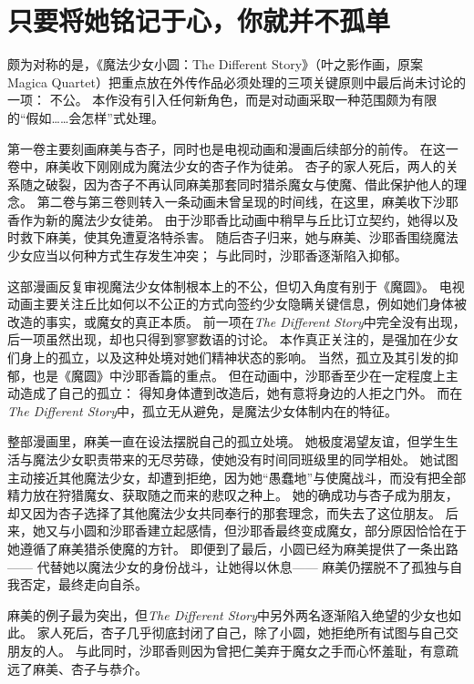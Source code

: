 \chapter[只要将她铭记于心，你就并不孤单]{只要将她铭记于心，你就并不孤单}


颇为对称的是，《魔法少女小圆：The Different Story》（叶之影作画，原案 Magica Quartet）把重点放在外传作品必须处理的三项关键原则中最后尚未讨论的一项：
不公。
本作没有引入任何新角色，而是对动画采取一种范围颇为有限的“假如……会怎样”式处理。

第一卷主要刻画麻美与杏子，同时也是电视动画和漫画后续部分的前传。
在这一卷中，麻美收下刚刚成为魔法少女的杏子作为徒弟。
杏子的家人死后，两人的关系随之破裂，因为杏子不再认同麻美那套同时猎杀魔女与使魔、借此保护他人的理念。
第二卷与第三卷则转入一条动画未曾呈现的时间线，在这里，麻美收下沙耶香作为新的魔法少女徒弟。
由于沙耶香比动画中稍早与丘比订立契约，她得以及时救下麻美，使其免遭夏洛特杀害。
随后杏子归来，她与麻美、沙耶香围绕魔法少女应当以何种方式生存发生冲突；
与此同时，沙耶香逐渐陷入抑郁。

这部漫画反复审视魔法少女体制根本上的不公，但切入角度有别于《魔圆》。
电视动画主要关注丘比如何以不公正的方式向签约少女隐瞒关键信息，例如她们身体被改造的事实，或魔女的真正本质。
前一项在\emph{The Different Story}中完全没有出现，后一项虽然出现，却也只得到寥寥数语的讨论。
本作真正关注的，是强加在少女们身上的孤立，以及这种处境对她们精神状态的影响。
当然，孤立及其引发的抑郁，也是《魔圆》中沙耶香篇的重点。
但在动画中，沙耶香至少在一定程度上主动造成了自己的孤立：
得知身体遭到改造后，她有意将身边的人拒之门外。
而在\emph{The Different Story}中，孤立无从避免，是魔法少女体制内在的特征。

整部漫画里，麻美一直在设法摆脱自己的孤立处境。
她极度渴望友谊，但学生生活与魔法少女职责带来的无尽劳碌，使她没有时间同班级里的同学相处。
她试图主动接近其他魔法少女，却遭到拒绝，因为她“愚蠢地”与使魔战斗，而没有把全部精力放在狩猎魔女、获取随之而来的悲叹之种上。
她的确成功与杏子成为朋友，却又因为杏子选择了其他魔法少女共同奉行的那套理念，而失去了这位朋友。
后来，她又与小圆和沙耶香建立起感情，但沙耶香最终变成魔女，部分原因恰恰在于她遵循了麻美猎杀使魔的方针。
即便到了最后，小圆已经为麻美提供了一条出路——
代替她以魔法少女的身份战斗，让她得以休息——
麻美仍摆脱不了孤独与自我否定，最终走向自杀。

麻美的例子最为突出，但\emph{The Different Story}中另外两名逐渐陷入绝望的少女也如此。
家人死后，杏子几乎彻底封闭了自己，除了小圆，她拒绝所有试图与自己交朋友的人。
与此同时，沙耶香则因为曾把仁美弃于魔女之手而心怀羞耻，有意疏远了麻美、杏子与恭介。

